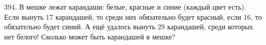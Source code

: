 394. В мешке лежат карандаши: белые, красные и синие (каждый цвет есть). Если вынуть 17 карандашей, то среди них обязательно будет красный, если 16, то обязательно будет синий. А ещё удалось вынуть 29 карандашей, среди которых нет белого! Сколько может быть карандашей в мешке?\\
